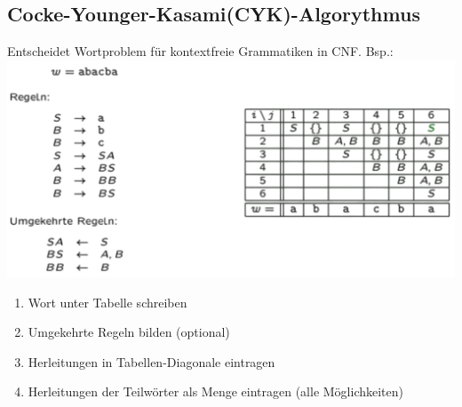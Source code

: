 \documentclass[12pt,a4paper]{article}
\begin{document}
	\subsection{Cocke-Younger-Kasami(CYK)-Algorythmus}
	Entscheidet Wortproblem für kontextfreie Grammatiken in CNF. Bsp.:\\
	\includegraphics[scale=0.3]{Bilder/cyk-Algo.png}
	\begin{enumerate}
		\item Wort unter Tabelle schreiben 
		\item Umgekehrte Regeln bilden (optional)
		\item Herleitungen in Tabellen-Diagonale eintragen
		\item Herleitungen der Teilwörter als Menge eintragen (alle Möglichkeiten)
	\end{enumerate}
\end{document}
